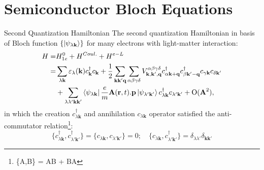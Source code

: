 \documentclass{beamer}
\begin{document}
\section{Semiconductor Bloch Equations}
\begin{frame}{Second Quantization Hamiltonian}
\quad The second quantization Hamiltonian in basis of Bloch function $\{\ket{\psi_{\lambda \textbf{k}}}\}$ for many electrons with light-matter interaction:
\begin{align}
	\label{2nd H}
H =& H_{1e}^0 + H^{Coul.} + H^{e-L}\nonumber\\=& \sum_{\lambda \textbf{k}} \varepsilon_{\lambda}(\textbf{k}) c^\dagger_{\textbf{k}} c_{\textbf{k}} +\frac{1}{2} \sum_{\textbf{k}\textbf{k}'\textbf{q}}\sum_{\alpha \beta \gamma \delta} V^{\alpha\beta\gamma\delta}_{\textbf{k},\textbf{k}',\textbf{q}}c^\dagger_{\alpha\textbf{k}+\textbf{q}} c^\dagger_{\beta\textbf{k}'-\textbf{q}} c_{\gamma\textbf{k}} c_{\delta \textbf{k}'}\\
&+ \sum_{\lambda \lambda' \textbf{k}\textbf{k}'} \bra{\psi_{\lambda \textbf{k}}}\frac{e}{m}\textbf{A}(\textbf{r},t).\textbf{p}\ket{\psi_{\lambda' \textbf{k}'}}c^{\dagger}_{\lambda \textbf{k}} c_{\lambda' \textbf{k}'}\nonumber + \mathrm{O}(\textbf{A}^2),
\end{align}
\quad in which the creation \(c^\dagger_{\lambda\textbf{k}}\) and annihilation \(c_{\lambda\textbf{k}}\) operator satisfied the anti-commutator relation\footnote{\{A,B\} = AB + BA}:
$$\{c^\dagger_{\lambda \textbf{k}},c^\dagger_{\lambda'\textbf{k}'}\} = \{c_{\lambda \textbf{k}},c_{\lambda'\textbf{k}'}\} = 0;\quad \{c_{\lambda \textbf{k}},c^\dagger_{\lambda'\textbf{k}'}\} = \delta_{\lambda\lambda'} \delta_{\textbf{k}\textbf{k}'}$$
\end{frame}
\end{document}
